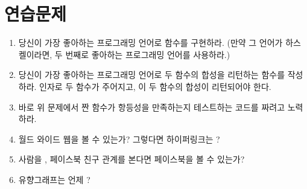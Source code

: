 \section{연습문제}

\begin{enumerate}
\tightlist
\item
  당신이 가장 좋아하는 프로그래밍 언어로 \trIdentity 함수를 구현하라.
  (만약 그 언어가 하스켈이라면, 두 번째로 좋아하는 프로그래밍 언어를 사용하라.)
\item
  당신이 가장 좋아하는 프로그래밍 언어로 두 함수의 합성을 리턴하는 함수를 작성하라.
  인자로 두 함수가 주어지고, 이 두 함수의 합성이 리턴되어야 한다.  
\item
  바로 위 문제에서 짠 함수가 항등성을 만족하는지 테스트하는 코드를 짜려고 노력하라.
\item
  월드 와이드 웹을  볼 수 있는가? 그렇다면 하이퍼링크는 ?
\item
  사람을 \trObject, 페이스북 친구 관계를  본다면
  페이스북을  볼 수 있는가?
\item
  유향그래프는 언제 ?
\end{enumerate}
